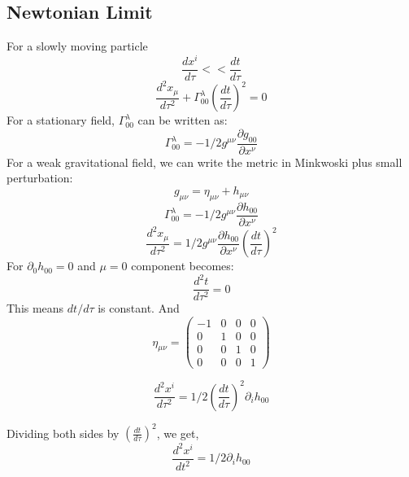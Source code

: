 \documentclass{ttuthes2007}
\begin{document}
\subsection{Newtonian Limit}
	For a slowly moving particle 
\begin{equation}
\frac{dx^i}{d\tau}<< \frac{dt}{d\tau}
\end{equation}
\begin{equation}
\frac{d^2x_\mu}{d\tau^2}+\Gamma^\lambda_{00}\left(\frac{dt}{d\tau}\right)^2=0
\end{equation}
For a stationary field, $\Gamma^\lambda_{00}$ can be written as:
\begin{equation}
\Gamma^\lambda_{00}= -1/2 g^{\mu \nu} \frac{\partial g_{00}}{\partial x^\nu}
\end{equation}	
For a weak gravitational field, we can write the metric in Minkwoski plus small
perturbation:
\begin{equation}
g_{\mu \nu}= \eta_{\mu \nu} + h_{\mu \nu}
\end{equation}
\begin{equation}
\Gamma^\lambda_{00}= -1/2 g^{\mu \nu} \frac{\partial h_{00}}{\partial x^\nu}
\end{equation}	
\begin{equation}
\frac{d^2x_\mu}{d\tau^2}=1/2 g^{\mu \nu} \frac{\partial h_{00}}{\partial x^\nu} \left(\frac{dt}{d\tau}\right)^2
\end{equation}
For $\partial_0h_{00}=0$ and $\mu=0$ component becomes:
\begin{equation}
\frac{d^2t}{d\tau^2}=0
\end{equation}
This means $dt/d\tau$ is constant. And
\begin{equation*}
\eta_{\mu\nu}=
 \begin{pmatrix}
    -1 & 0 & 0 & 0 \\
    0 & 1 & 0 & 0 \\
    0 & 0 & 1 & 0 \\
    0 & 0 & 0 & 1 
 \end{pmatrix}
\end{equation*}

\begin{equation}                                                                
\frac{d^2x^i}{d\tau ^2}=1/2 \left(\frac{dt}{d\tau}\right)^2 \partial _i h_{00}
\end{equation} 

Dividing both sides by $\left(\frac{dt}{d\tau}\right)^2$, we get,
\begin{equation} \label{GR}                                                               
\frac{d^2x^i}{dt^2}=1/2 \partial _i h_{00}
\end{equation} 
\end{document}

